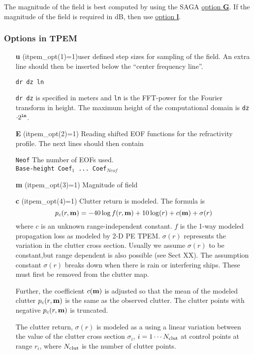 \documentclass{saclantc}
\begin{document}
The magnitude of the field is best computed by using the {\sf SAGA}
\underline{option {\bf G}}. If the magnitude of the field is required in
dB, then use \underline{option {\bf l}}.

\subsubsection{Options in TPEM}
\begin{itemize}
\item[\bf u]  (itpem\_opt(1)=1)user defined step sizes for sampling of the field. 
An extra line should
then be inserted below the ``center frequency line''.

{\tt dr dz ln}

\noindent
{\tt dr dz} is specified in meters and {\tt ln} is the FFT-power for
the Fourier transform in height. The maximum height of the
computational domain is {\tt dz}$\cdot
2^{\tt ln}$.
 \item[\bf E] (itpem\_opt(2)=1) Reading shifted  EOF functions for the refractivity profile.    
The next lines should then contain

{\tt Neof}  \hspace{1in} The number of EOFs used. \\
\noindent
{\tt Base-height Coef$_1$ ... Coef$_{Neof}$} 
\item[\bf m] (itpem\_opt(3)=1) Magnitude of field

\item[\bf c]  (itpem\_opt(4)=1) Clutter return is modeled. The formula is
\begin{equation}
p_c(r, {\bf m})= -40 \log f(r, {\bf m})+ 10 \log(r)+ c({\bf m}) +\sigma (r)
\end{equation}
where $c$ is an unknown range-independent constant. $f$ is the 1-way
modeled propagation loss as modeled by 2-D PE TPEM.  $\sigma (r)$
represents the variation in
the clutter cross section. Usually we assume  $\sigma (r)$ to be
constant,but range dependent is also possible (see Sect XX). The
assumption constant  $\sigma (r)$ breaks down when there is rain or
interfering ships. These must first be removed from the clutter map.

Further, the coefficient $ c({\bf m})$ is adjusted so that the mean of
the modeled clutter $ p_c(r, {\bf m})$ is the same as the observed
clutter. The clutter points with negative $p_c(r, {\bf m})$ is truncated.

The clutter return, $\sigma (r)$ is modeled as a using a linear
variation between the value of the clutter cross section $\sigma_i$, $i=1
\cdots N_{\rm clut} $ at
control points at range $r_i$, where  $N_{\rm clut} $ is the number
of clutter points.


\end{itemize}
\end{document}
